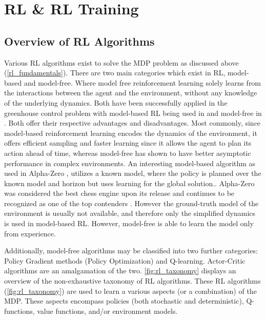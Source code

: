 \chapter{RL \& RL Training }
\section{Overview of RL Algorithms}\label{section:RL aglorithms overview}
Various RL algorithms exist to solve the MDP problem as discussed above (\autoref{rl_fundamentals}). There are two main categories which exist in RL, model-based and model-free. Where model free reinforcement learning solely learns from the interactions between the agent and the environment, without any knowledge of the underlying dynamics. Both have been successfully applied in the greenhouse control problem with model-based RL being used in \cite{zhangRobustModelbasedReinforcement2021,} and model-free in \cite{jansenOptimalControlLettuce2023,ajagekarDeepReinforcementLearning2022,vandenbemdRobustDeepReinforcement,hemmingRemoteControlGreenhouse2019}. Both offer their respective advantages and disadvantages. Most commonly, since model-based reinforcement learning encodes the dynamics of the environment, it offers efficient sampling and faster learning since it allows the agent to plan its action ahead of time, whereas model-free has shown to have better asymptotic performance in complex environments. An interesting model-based algorithm as used in Alpha-Zero \cite{silverGeneralReinforcementLearning2018}, 
utilizes a known model, where the policy is planned over the known model and horizon but uses learning for the global solution.\cite{jonkerModelbasedReinforcementLearning}. Alpha-Zero was considered the best chess engine upon its release and continues to be recognized as one of the top contenders \cite{silverGeneralReinforcementLearning2018}. However the ground-truth model of the environment is usually not available, and therefore only the simplified dynamics is used in model-based RL. However, model-free is able to learn the model only from experience. 

Additionally, model-free algorithms may be classified into two further categories: Policy Gradient methods (Policy Optimization) and Q-learning. Actor-Critic algorithms are an amalgamation of the two. \autoref{fig:rl_taxonomy} displays an overview of the non-exhaustive taxonomy of RL algorithms. These RL algorithms (\autoref{fig:rl_taxonomy}) are used to  learn a various aspects (or a combination) of the MDP. These aspects encompass policies (both stochastic and deterministic), Q-functions, value functions, and/or environment models.

